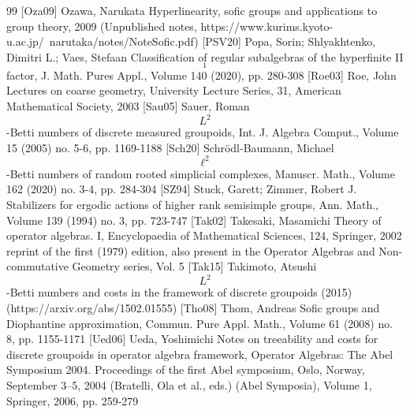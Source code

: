 \documentclass[10pt]{amsart}
\theoremstyle{definition}
\begin{document}
\begin{thebibliography}{99}
 [Oza09] Ozawa, Narukata Hyperlinearity, sofic groups and applications to group theory, 2009 (Unpublished notes, https://www.kurims.kyoto-u.ac.jp/~narutaka/notes/NoteSofic.pdf)
 [PSV20] Popa, Sorin; Shlyakhtenko, Dimitri L.; Vaes, Stefaan Classification of regular subalgebras of the hyperfinite II$$_1$$ factor, J. Math. Pures Appl., Volume 140 (2020), pp. 280-308
 [Roe03] Roe, John Lectures on coarse geometry, University Lecture Series, 31, American Mathematical Society, 2003
 [Sau05] Sauer, Roman $${L}^2$$-Betti numbers of discrete measured groupoids, Int. J. Algebra Comput., Volume 15 (2005) no. 5-6, pp. 1169-1188
 [Sch20] Schrödl-Baumann, Michael $$\ell ^2$$-Betti numbers of random rooted simplicial complexes, Manuscr. Math., Volume 162 (2020) no. 3-4, pp. 284-304
 [SZ94] Stuck, Garett; Zimmer, Robert J. Stabilizers for ergodic actions of higher rank semisimple groups, Ann. Math., Volume 139 (1994) no. 3, pp. 723-747
 [Tak02] Takesaki, Masamichi Theory of operator algebras. I, Encyclopaedia of Mathematical Sciences, 124, Springer, 2002 reprint of the first (1979) edition, also present in the Operator Algebras and Non-commutative Geometry series, Vol. 5
 [Tak15] Takimoto, Atsushi $${L}^2$$-Betti numbers and costs in the framework of discrete groupoids (2015) (https://arxiv.org/abs/1502.01555)
 [Tho08] Thom, Andreas Sofic groups and Diophantine approximation, Commun. Pure Appl. Math., Volume 61 (2008) no. 8, pp. 1155-1171
 [Ued06] Ueda, Yoshimichi Notes on treeability and costs for discrete groupoids in operator algebra framework, Operator Algebras: The Abel Symposium 2004. Proceedings of the first Abel symposium, Oslo, Norway, September 3–5, 2004 (Bratelli, Ola et al., eds.) (Abel Symposia), Volume 1, Springer, 2006, pp. 259-279
\end{thebibliography}
\end{document}
